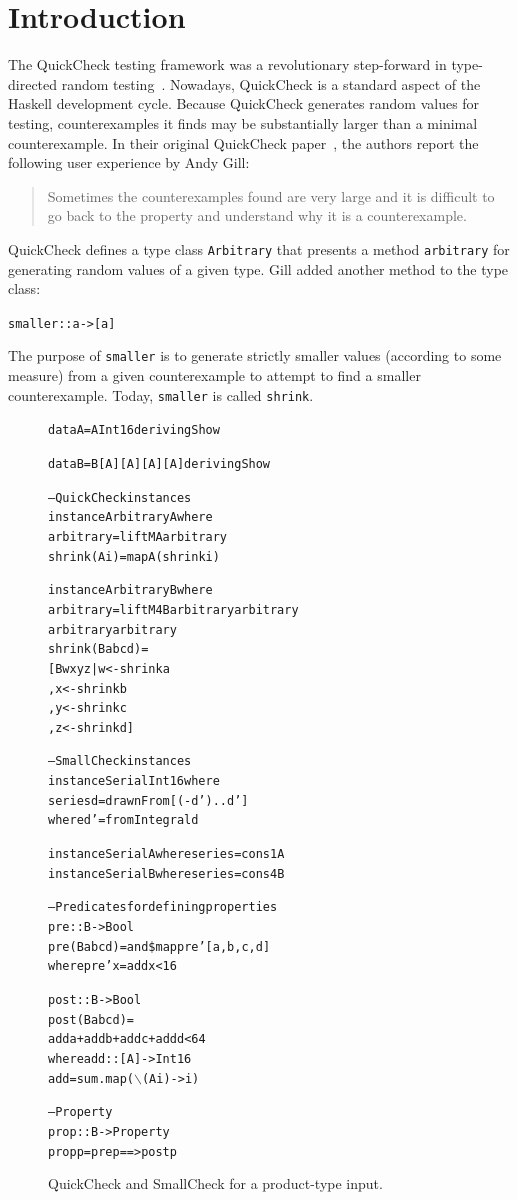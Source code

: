 \documentclass[10pt]{sigplanconf}
\newenvironment{code}{\begin{alltt}}{\end{alltt}}
\newcommand{\ttp}[1]{\texttt{#1}}
\begin{document}
\section{Introduction}\label{sec:intro}
The QuickCheck testing framework was a revolutionary step-forward in
type-directed random testing~\cite{qc}.  Nowadays, QuickCheck is a standard
aspect of the Haskell development cycle.  Because QuickCheck generates random
values for testing, counterexamples it finds may be substantially larger
than a minimal counterexample.  In their original QuickCheck paper~\cite{qc},
the authors report the following user experience by Andy Gill:
%
\begin{quote}
Sometimes the counterexamples found are very large and it is difficult to go
back to the property and understand why it is a counterexample.
\end{quote}
%
\noindent
QuickCheck defines a type class \ttp{Arbitrary} that presents a method
\ttp{arbitrary} for generating random values of a given type.  Gill added another
method to the type class:
%
\begin{code}
smaller :: a -> [a]
\end{code}
%
\noindent
The purpose of \ttp{smaller} is to generate strictly smaller values (according to
some measure) from a given counterexample to attempt to find a smaller
counterexample.  Today, \ttp{smaller} is called \ttp{shrink}.

\begin{figure}[ht]
\begin{code}
data A = A Int16 deriving Show

data B = B [A] [A] [A] [A] deriving Show

-- QuickCheck instances
instance Arbitrary A where
  arbitrary    = liftM A arbitrary
  shrink (A i) = map A (shrink i)

instance Arbitrary B where
  arbitrary = liftM4 B arbitrary arbitrary
                       arbitrary arbitrary
  shrink (B a b c d) =
    [ B w x y z | w <- shrink a
                , x <- shrink b
                , y <- shrink c
                , z <- shrink d ]

-- SmallCheck instances
instance Serial Int16 where
  series d = drawnFrom [(-d')..d']
    where d' = fromIntegral d

instance Serial A where series = cons1 A
instance Serial B where series = cons4 B

-- Predicates for defining properties
pre :: B -> Bool
pre (B a b c d) = and \$ map pre' [a, b, c, d]
  where pre' x = add x < 16

post :: B -> Bool
post (B a b c d) =
  add a + add b + add c + add d < 64
  where add :: [A] -> Int16
        add = sum . map (\(\backslash\)(A i) -> i)

-- Property
prop :: B -> Property
prop p = pre p ==> post p
\end{code}
  \caption{QuickCheck and SmallCheck for a product-type input.}
  \label{fig:initial}
\end{figure}
\end{document}
